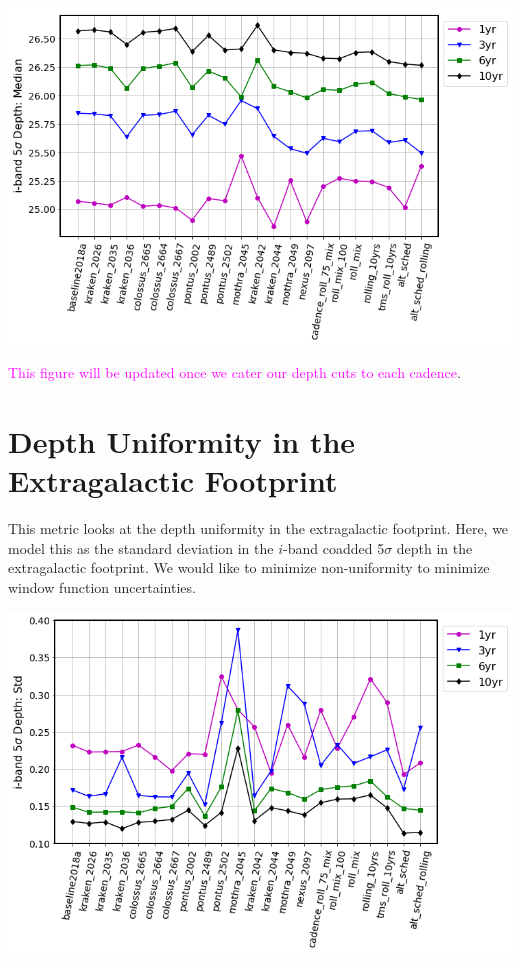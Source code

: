 \documentclass[a4paper,10pt]{article}
\newcommand{\cl}[1]{\textcolor{magenta}{#1}}
\begin{document}
\begin{minipage}{\columnwidth}
\vspace*{2em}
\centering
 \includegraphics[width=.75\columnwidth]{lss_compare_depth_median_22dbs.png}
\vspace*{2em}
\end{minipage}

\cl{This figure will be updated once we cater our depth cuts to each cadence}.

\newpage
\section*{Depth Uniformity in the Extragalactic Footprint\label{depth std}}
This metric looks at the depth uniformity in the extragalactic footprint. Here, we model this as the standard deviation in the $i$-band coadded 5$\sigma$ depth in the extragalactic footprint.  We would like to minimize non-uniformity to minimize window function uncertainties. 

\begin{minipage}{\columnwidth}
\vspace*{2em}
\centering
 \includegraphics[width=.75\columnwidth]{lss_compare_depth_std_22dbs.png}
\vspace*{2em}
\end{minipage}
\end{document}
